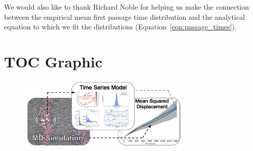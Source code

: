 \documentclass{article}
\begin{document}
  We would also like to thank Richard Noble for helping us make the connection 
  between the empirical mean first passage time distribution and the analytical
  equation to which we fit the distributions (Equation~\ref{eqn:passage_times}).
  

  \clearpage

  
  

  \newpage

  \section*{TOC Graphic}
    
  \begin{figure}[!htb]
  \centering
  \includegraphics[width=3.25in]{toc.pdf}
  \end{figure}
\end{document}

